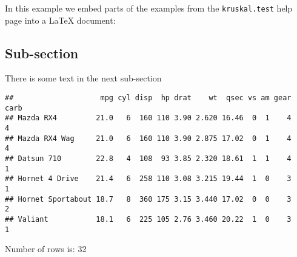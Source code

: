 \documentclass{article}\usepackage[]{graphicx}\usepackage[]{color}
\makeatletter
\newenvironment{kframe}{%
 \def\at@end@of@kframe{}%
 \ifinner\ifhmode%
  \def\at@end@of@kframe{\end{minipage}}%
  \begin{minipage}{\columnwidth}%
 \fi\fi%
 \def\FrameCommand##1{\hskip\@totalleftmargin \hskip-\fboxsep
 \colorbox{shadecolor}{##1}\hskip-\fboxsep
     \hskip-\linewidth \hskip-\@totalleftmargin \hskip\columnwidth}%
 \MakeFramed {\advance\hsize-\width
   \@totalleftmargin\z@ \linewidth\hsize
   \@setminipage}}%
 {\par\unskip\endMakeFramed%
 \at@end@of@kframe}
\newenvironment{knitrout}{}{} %
\makeatother
\begin{document}
In this example we embed parts of the examples from the
\texttt{kruskal.test} help page into a \LaTeX{} document:

\newpage
\subsection{Sub-section}
There is some text in the next sub-section 

\begin{knitrout}
\color{fgcolor}\begin{kframe}
\begin{verbatim}
##                    mpg cyl disp  hp drat    wt  qsec vs am gear carb
## Mazda RX4         21.0   6  160 110 3.90 2.620 16.46  0  1    4    4
## Mazda RX4 Wag     21.0   6  160 110 3.90 2.875 17.02  0  1    4    4
## Datsun 710        22.8   4  108  93 3.85 2.320 18.61  1  1    4    1
## Hornet 4 Drive    21.4   6  258 110 3.08 3.215 19.44  1  0    3    1
## Hornet Sportabout 18.7   8  360 175 3.15 3.440 17.02  0  0    3    2
## Valiant           18.1   6  225 105 2.76 3.460 20.22  1  0    3    1
\end{verbatim}
\end{kframe}
\end{knitrout}
Number of rows is: 32
\end{document}
